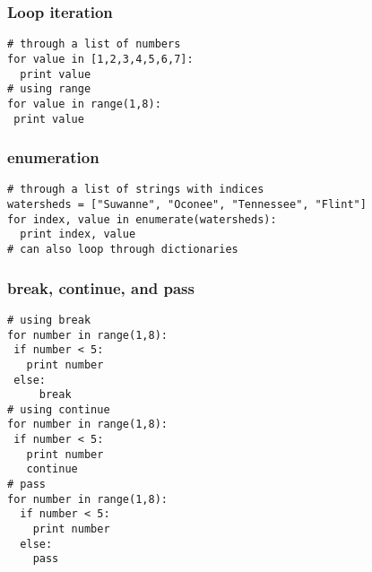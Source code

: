 \documentclass{beamer}
\begin{document}
\begin{frame}[fragile]
\frametitle{Loop iteration}
\begin{lstlisting}
# through a list of numbers
for value in [1,2,3,4,5,6,7]:
  print value
# using range
for value in range(1,8):
 print value
\end{lstlisting}
\end{frame}

\begin{frame}[fragile]
\frametitle{enumeration}
\begin{lstlisting}
# through a list of strings with indices
watersheds = ["Suwanne", "Oconee", "Tennessee", "Flint"]
for index, value in enumerate(watersheds):
  print index, value
# can also loop through dictionaries
\end{lstlisting}
\end{frame}

\begin{frame}[fragile]
\frametitle{break, continue, and pass}
\begin{lstlisting}
# using break
for number in range(1,8):
 if number < 5:
   print number
 else:
     break
# using continue
for number in range(1,8):
 if number < 5:
   print number
   continue
# pass
for number in range(1,8):
  if number < 5:
    print number
  else:
    pass
\end{lstlisting}
\end{frame}
\end{document}
